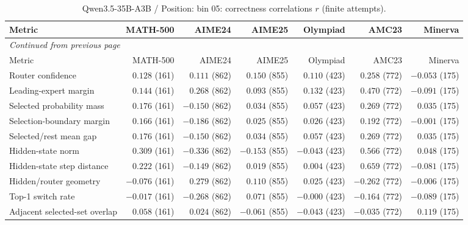 \begingroup\scriptsize\setlength{\tabcolsep}{4pt}
\begin{longtable}{@{}lrrrrrr@{}}
\caption{Qwen3.5-35B-A3B / Position: bin 05: correctness correlations $r$ (finite attempts).}\label{tab:multi-qwen-position-bin_05}\\
\toprule
Metric & MATH-500 & AIME24 & AIME25 & Olympiad & AMC23 & Minerva \\
\midrule\endfirsthead
\multicolumn{7}{l}{\textit{Continued from previous page}}\\
\toprule
Metric & MATH-500 & AIME24 & AIME25 & Olympiad & AMC23 & Minerva \\
\midrule\endhead
\bottomrule\endfoot
Router confidence & $0.128$ (161) & $0.111$ (862) & $0.150$ (855) & $0.110$ (423) & $0.258$ (772) & $-0.053$ (175) \\
Leading-expert margin & $0.144$ (161) & $0.268$ (862) & $0.093$ (855) & $0.132$ (423) & $0.470$ (772) & $-0.091$ (175) \\
Selected probability mass & $0.176$ (161) & $-0.150$ (862) & $0.034$ (855) & $0.057$ (423) & $0.269$ (772) & $0.035$ (175) \\
Selection-boundary margin & $0.166$ (161) & $-0.186$ (862) & $0.025$ (855) & $0.026$ (423) & $0.192$ (772) & $-0.001$ (175) \\
Selected/rest mean gap & $0.176$ (161) & $-0.150$ (862) & $0.034$ (855) & $0.057$ (423) & $0.269$ (772) & $0.035$ (175) \\
Hidden-state norm & $0.309$ (161) & $-0.336$ (862) & $-0.153$ (855) & $-0.043$ (423) & $0.566$ (772) & $0.048$ (175) \\
Hidden-state step distance & $0.222$ (161) & $-0.149$ (862) & $0.019$ (855) & $0.004$ (423) & $0.659$ (772) & $-0.081$ (175) \\
Hidden/router geometry & $-0.076$ (161) & $0.279$ (862) & $0.110$ (855) & $0.025$ (423) & $-0.262$ (772) & $-0.006$ (175) \\
Top-1 switch rate & $-0.017$ (161) & $-0.268$ (862) & $0.071$ (855) & $-0.000$ (423) & $-0.164$ (772) & $-0.089$ (175) \\
Adjacent selected-set overlap & $0.058$ (161) & $0.024$ (862) & $-0.061$ (855) & $-0.043$ (423) & $-0.035$ (772) & $0.119$ (175) \\
\end{longtable}\endgroup

